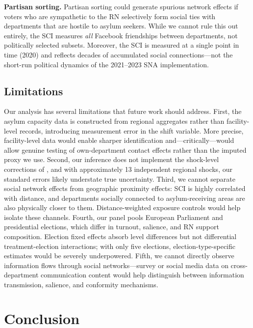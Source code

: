 \documentclass[12pt]{article}
\begin{document}
\textbf{Partisan sorting.} Partisan sorting could generate spurious network effects if voters who are sympathetic to the RN selectively form social ties with departments that are hostile to asylum seekers. While we cannot rule this out entirely, the SCI measures \textit{all} Facebook friendships between departments, not politically selected subsets. Moreover, the SCI is measured at a single point in time (2020) and reflects decades of accumulated social connections---not the short-run political dynamics of the 2021--2023 SNA implementation.

\subsection{Limitations}

Our analysis has several limitations that future work should address. First, the asylum capacity data is constructed from regional aggregates rather than facility-level records, introducing measurement error in the shift variable. More precise, facility-level data would enable sharper identification and---critically---would allow genuine testing of own-department contact effects rather than the imputed proxy we use. Second, our inference does not implement the shock-level corrections of \citet{adao2019shift}, and with approximately 13 independent regional shocks, our standard errors likely understate true uncertainty. Third, we cannot separate social network effects from geographic proximity effects: SCI is highly correlated with distance, and departments socially connected to asylum-receiving areas are also physically closer to them. Distance-weighted exposure controls would help isolate these channels. Fourth, our panel pools European Parliament and presidential elections, which differ in turnout, salience, and RN support composition. Election fixed effects absorb level differences but not differential treatment-election interactions; with only five elections, election-type-specific estimates would be severely underpowered. Fifth, we cannot directly observe information flows through social networks---survey or social media data on cross-department communication content would help distinguish between information transmission, salience, and conformity mechanisms.

\section{Conclusion}
\label{sec:conclusion}
\end{document}
